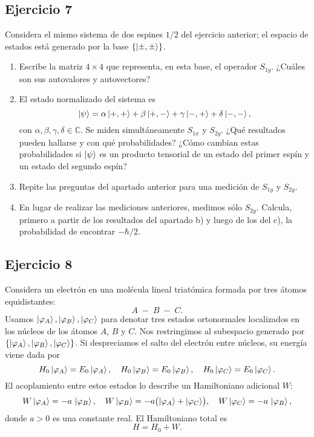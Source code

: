 \documentclass[a4paper,11pt]{article}
\begin{document}
\subsection*{Ejercicio 7}
Considera el mismo sistema de dos espines \(1/2\) del ejercicio anterior; el espacio de estados está generado por la base \(\{\ket{\pm,\pm}\}\).
\begin{enumerate}
  \item Escribe la matriz \(4\times4\) que representa, en esta base, el operador \(S_{1y}\). ¿Cuáles son sus autovalores y autovectores?
  \item El estado normalizado del sistema es
    \[
      \ket{\psi}=\alpha\ket{+,+} + \beta\ket{+,-} + \gamma\ket{-,+} + \delta\ket{-,-},
    \]
    con \(\alpha,\beta,\gamma,\delta\in\mathbb{C}\). Se miden simultáneamente \(S_{1x}\) y \(S_{2y}\). ¿Qué resultados pueden hallarse y con qué probabilidades? ¿Cómo cambian estas probabilidades si \(\ket{\psi}\) es un producto tensorial de un estado del primer espín y un estado del segundo espín?
  \item Repite las preguntas del apartado anterior para una medición de \(S_{1y}\) y \(S_{2y}\).
  \item En lugar de realizar las mediciones anteriores, medimos sólo \(S_{2y}\). Calcula, primero a partir de los resultados del apartado b) y luego de los del c), la probabilidad de encontrar \(-\hbar/2\).
\end{enumerate}

\subsection*{Ejercicio 8}
Considera un electrón en una molécula lineal triatómica formada por tres átomos equidistantes:
\[
A\;-\;B\;-\;C.
\]
Usamos \(\ket{\varphi_A},\ket{\varphi_B},\ket{\varphi_C}\) para denotar tres estados ortonormales localizados en los núcleos de los átomos \(A\), \(B\) y \(C\). Nos restringimos al subespacio generado por \(\{\ket{\varphi_A},\ket{\varphi_B},\ket{\varphi_C}\}\). Si despreciamos el salto del electrón entre núcleos, su energía viene dada por
\[
H_0\ket{\varphi_A}=E_0\ket{\varphi_A},\quad
H_0\ket{\varphi_B}=E_0\ket{\varphi_B},\quad
H_0\ket{\varphi_C}=E_0\ket{\varphi_C}.
\]
El acoplamiento entre estos estados lo describe un Hamiltoniano adicional \(W\):
\[
W\ket{\varphi_A}=-a\,\ket{\varphi_B},\quad
W\ket{\varphi_B}=-a\bigl(\ket{\varphi_A}+\ket{\varphi_C}\bigr),\quad
W\ket{\varphi_C}=-a\,\ket{\varphi_B},
\]
donde \(a>0\) es una constante real. El Hamiltoniano total es
\[
H = H_0 + W.
\]
\end{document}
